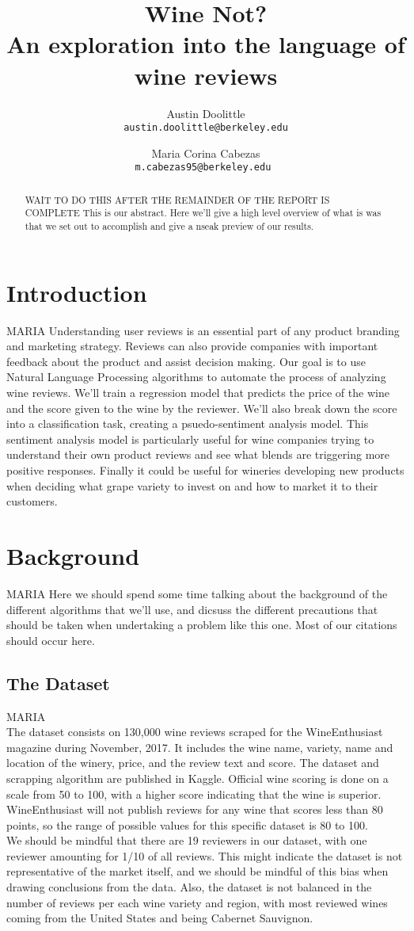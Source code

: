 \documentclass[11pt,english]{article}
\title{
    Wine Not? \\
    \large An exploration into the language of wine reviews
}
\author{
    Austin Doolittle \\
    \texttt{austin.doolittle@berkeley.edu}
    \and
    Maria Corina Cabezas \\
    \texttt{m.cabezas95@berkeley.edu }
}
\begin{document}
\maketitle
\begin{abstract}
    WAIT TO DO THIS AFTER THE REMAINDER OF THE REPORT IS COMPLETE
    This is our abstract. Here we'll give a high level overview of what is was that we set out to accomplish and give a nseak preview of our results.
\end{abstract}

\section{Introduction}
    MARIA
    Understanding user reviews is an essential part of any product branding and marketing strategy. Reviews can also provide companies with important feedback about the product and assist decision making. Our goal is to use Natural Language Processing algorithms to automate the process of analyzing wine reviews. We'll train a regression model that predicts the price of the wine and the score given to the wine by the reviewer. We'll also break down the score into a classification task, creating a psuedo-sentiment analysis model. This sentiment analysis model is particularly useful for wine companies trying to understand their own product reviews and see what blends are triggering more positive responses. Finally it could be useful for wineries developing new products when deciding what grape variety to invest on and how to market it to their customers. 
\section{Background}
    MARIA
    Here we should spend some time talking about the background of the different algorithms that we'll use, and dicsuss the different precautions that should be taken when undertaking a problem like this one. Most of our citations should occur here.

\subsection{The Dataset}
    MARIA \\
    The dataset consists on 130,000 wine reviews scraped for the WineEnthusiast magazine during November, 2017. It includes the wine name, variety, name and location of the winery, price, and the review text and score. The dataset and scrapping algorithm are published in Kaggle. 
    Official wine scoring is done on a scale from 50 to 100, with a higher score indicating that the wine is superior. WineEnthusiast will not publish reviews for any wine that scores less than 80 points, so the range of possible values for this specific dataset is 80 to 100. \\
    We should be mindful that there are 19 reviewers in our dataset, with one reviewer amounting for 1/10 of all reviews. This might indicate the dataset is not representative of the market itself, and we should be mindful of this bias when drawing conclusions from the data. 
    Also, the dataset is not balanced in the number of reviews per each wine variety and region, with most reviewed wines coming from the United States and being Cabernet Sauvignon.
\end{document}
